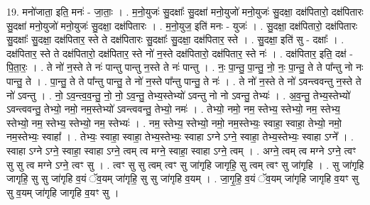 \documentclass[17pt]{extarticle}
\begin{document}
19. मनो॑जाता॒ इति॒ मनः॑ - जा॒ताः॒ । . म॒नो॒युजः॑ सु॒दक्षाः᳚ सु॒दक्षा॑ मनो॒युजो॑ मनो॒युजः॑ सु॒दक्षा॒ दक्ष॑पितारो॒ दक्ष॑पितारः सु॒दक्षा॑ मनो॒युजो॑ मनो॒युजः॑ सु॒दक्षा॒ दक्ष॑पितारः । . म॒नो॒युज॒ इति॑ मनः - युजः॑ । . सु॒दक्षा॒ दक्ष॑पितारो॒ दक्ष॑पितारः सु॒दक्षाः᳚ सु॒दक्षा॒ दक्ष॑पितार॒ स्ते ते दक्ष॑पितारः सु॒दक्षाः᳚ सु॒दक्षा॒ दक्ष॑पितार॒ स्ते । . सु॒दक्षा॒ इति॑ सु - दक्षाः᳚ । . दक्ष॑पितार॒ स्ते ते दक्ष॑पितारो॒ दक्ष॑पितार॒ स्ते नो॑ न॒स्ते दक्ष॑पितारो॒ दक्ष॑पितार॒ स्ते नः॑ । . दक्ष॑पितार॒ इति॒ दक्ष॑ - पि॒ता॒रः॒ । . ते नो॑ न॒स्ते ते नः॑ पान्तु पान्तु न॒स्ते ते नः॑ पान्तु । . नः॒ पा॒न्तु॒ पा॒न्तु॒ नो॒ नः॒ पा॒न्तु॒ ते ते पा᳚न्तु नो नः पान्तु॒ ते । . पा॒न्तु॒ ते ते पा᳚न्तु पान्तु॒ ते नो॑ न॒स्ते पा᳚न्तु पान्तु॒ ते नः॑ । . ते नो॑ न॒स्ते ते नो॑ ऽवन्त्ववन्तु न॒स्ते ते नो॑ ऽवन्तु । . नो॒ ऽव॒न्त्व॒व॒न्तु॒ नो॒ नो॒ ऽव॒न्तु॒ तेभ्य॒स्तेभ्यो॑ ऽवन्तु नो नो ऽवन्तु॒ तेभ्यः॑ । . अ॒व॒न्तु॒ तेभ्य॒स्तेभ्यो॑ ऽवन्त्ववन्तु॒ तेभ्यो॒ नमो॒ नम॒स्तेभ्यो॑ ऽवन्त्ववन्तु॒ तेभ्यो॒ नमः॑ । . तेभ्यो॒ नमो॒ नम॒ स्तेभ्य॒ स्तेभ्यो॒ नम॒ स्तेभ्य॒ स्तेभ्यो॒ नम॒ स्तेभ्य॒ स्तेभ्यो॒ नम॒ स्तेभ्यः॑ । . नम॒ स्तेभ्य॒ स्तेभ्यो॒ नमो॒ नम॒स्तेभ्यः॒ स्वाहा॒ स्वाहा॒ तेभ्यो॒ नमो॒ नम॒स्तेभ्यः॒ स्वाहा᳚ । . तेभ्यः॒ स्वाहा॒ स्वाहा॒ तेभ्य॒स्तेभ्यः॒ स्वाहा ऽग्ने ऽग्ने॒ स्वाहा॒ तेभ्य॒स्तेभ्यः॒ स्वाहा ऽग्ने᳚ । . स्वाहा ऽग्ने ऽग्ने॒ स्वाहा॒ स्वाहा ऽग्ने॒ त्वम् त्व मग्ने॒ स्वाहा॒ स्वाहा ऽग्ने॒ त्वम् । . अग्ने॒ त्वम् त्व मग्ने ऽग्ने॒ त्वꣳ सु सु त्व मग्ने ऽग्ने॒ त्वꣳ सु । . त्वꣳ सु सु त्वम् त्वꣳ सु जा॑गृहि जागृहि॒ सु त्वम् त्वꣳ सु जा॑गृहि । . सु जा॑गृहि जागृहि॒ सु सु जा॑गृहि व॒यं ॅव॒यम् जा॑गृहि॒ सु सु जा॑गृहि व॒यम् । . जा॒गृ॒हि॒ व॒यं ॅव॒यम् जा॑गृहि जागृहि व॒यꣳ सु सु व॒यम् जा॑गृहि जागृहि व॒यꣳ सु । \newline
\end{document}
